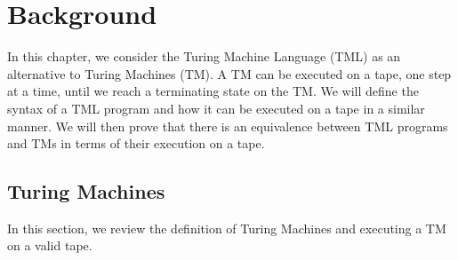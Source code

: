 \chapter{Background}
In this chapter, we consider the Turing Machine Language (TML) as an alternative to Turing Machines (TM). A TM can be executed on a tape, one step at a time, until we reach a terminating state on the TM. We will define the syntax of a TML program and how it can be executed on a tape in a similar manner. We will then prove that there is an equivalence between TML programs and TMs in terms of their execution on a tape.

\section{Turing Machines}
In this section, we review the definition of Turing Machines and executing a TM on a valid tape.

